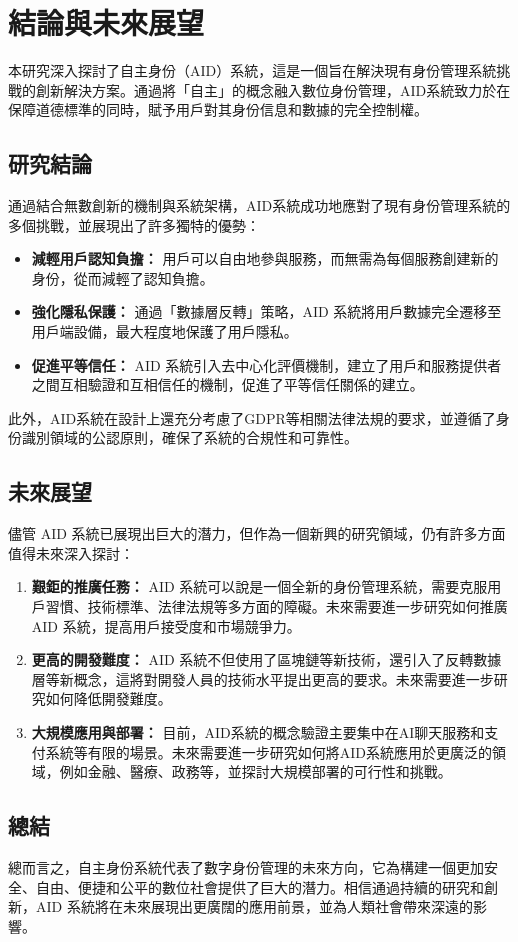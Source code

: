 
\chapter{結論與未來展望}
本研究深入探討了自主身份（AID）系統，這是一個旨在解決現有身份管理系統挑戰的創新解決方案。通過將「自主」的概念融入數位身份管理，AID系統致力於在保障道德標準的同時，賦予用戶對其身份信息和數據的完全控制權。
\section{研究結論}
通過結合無數創新的機制與系統架構，AID系統成功地應對了現有身份管理系統的多個挑戰，並展現出了許多獨特的優勢：
\begin{itemize}
    \item \textbf{減輕用戶認知負擔：} 用戶可以自由地參與服務，而無需為每個服務創建新的身份，從而減輕了認知負擔。
    \item \textbf{強化隱私保護：} 通過「數據層反轉」策略，AID 系統將用戶數據完全遷移至用戶端設備，最大程度地保護了用戶隱私。
    \item \textbf{促進平等信任：} AID 系統引入去中心化評價機制，建立了用戶和服務提供者之間互相驗證和互相信任的機制，促進了平等信任關係的建立。
\end{itemize}
此外，AID系統在設計上還充分考慮了GDPR等相關法律法規的要求，並遵循了身份識別領域的公認原則，確保了系統的合規性和可靠性。
\section{未來展望}
儘管 AID 系統已展現出巨大的潛力，但作為一個新興的研究領域，仍有許多方面值得未來深入探討：
\begin{enumerate}
    \item \textbf{艱鉅的推廣任務：} AID 系統可以說是一個全新的身份管理系統，需要克服用戶習慣、技術標準、法律法規等多方面的障礙。未來需要進一步研究如何推廣 AID 系統，提高用戶接受度和市場競爭力。
    \item \textbf{更高的開發難度：} AID 系統不但使用了區塊鏈等新技術，還引入了反轉數據層等新概念，這將對開發人員的技術水平提出更高的要求。未來需要進一步研究如何降低開發難度。
    \item \textbf{大規模應用與部署：} 目前，AID系統的概念驗證主要集中在AI聊天服務和支付系統等有限的場景。未來需要進一步研究如何將AID系統應用於更廣泛的領域，例如金融、醫療、政務等，並探討大規模部署的可行性和挑戰。
\end{enumerate}
\section{總結}
總而言之，自主身份系統代表了數字身份管理的未來方向，它為構建一個更加安全、自由、便捷和公平的數位社會提供了巨大的潛力。相信通過持續的研究和創新，AID 系統將在未來展現出更廣闊的應用前景，並為人類社會帶來深遠的影響。